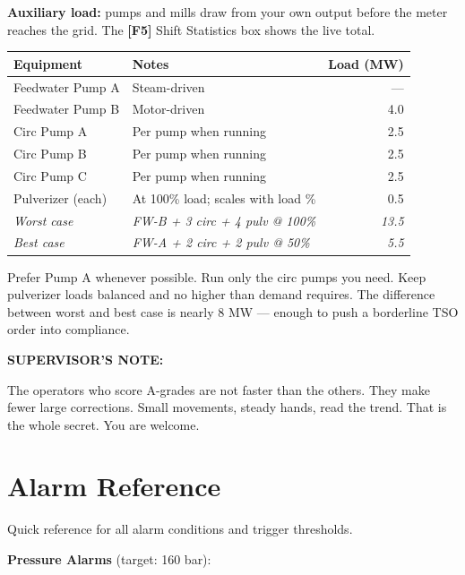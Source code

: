 \documentclass[10pt,a5paper]{article}
\newenvironment{notebox}{%
  \vspace{4pt}%
  \textbf{SUPERVISOR'S NOTE:} \bfseries%
}{%
}
\newcommand{\key}[1]{\textbf{[#1]}}
\begin{document}
\textbf{Auxiliary load:} pumps and mills draw from your own output before the
meter reaches the grid. The \key{F5} Shift Statistics box shows the live total.

\begin{center}
\begin{tabular}{llr}
\toprule
\textbf{Equipment} & \textbf{Notes} & \textbf{Load (MW)} \\
\midrule
Feedwater Pump A  & Steam-driven                         & --- \\
Feedwater Pump B  & Motor-driven                           & 4.0 \\
Circ Pump A       & Per pump when running                  & 2.5 \\
Circ Pump B       & Per pump when running                  & 2.5 \\
Circ Pump C       & Per pump when running                  & 2.5 \\
Pulverizer (each) & At 100\% load; scales with load \%     & 0.5 \\
\midrule
\textit{Worst case} & \textit{FW-B + 3 circ + 4 pulv @ 100\%} & \textit{13.5} \\
\textit{Best case}  & \textit{FW-A + 2 circ + 2 pulv @ 50\%}  & \textit{5.5}  \\
\bottomrule
\end{tabular}
\end{center}

Prefer Pump A whenever possible. Run only the circ pumps you need. Keep
pulverizer loads balanced and no higher than demand requires. The difference
between worst and best case is nearly 8 MW --- enough to push a borderline
TSO order into compliance.


\begin{notebox}
The operators who score A-grades are not faster than the others. They make
fewer large corrections. Small movements, steady hands, read the trend. That is
the whole secret. You are welcome.
\end{notebox}

\section{Alarm Reference}

Quick reference for all alarm conditions and trigger thresholds.

\textbf{Pressure Alarms} (target: 160 bar):
\end{document}

